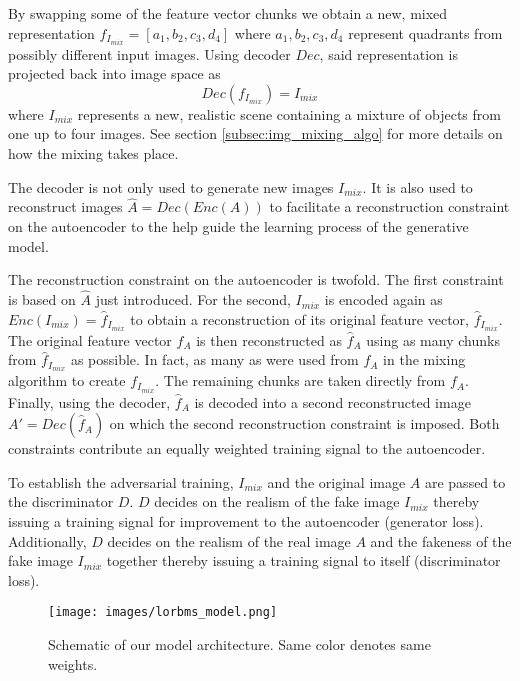 \documentclass[12pt,a4paper]{article}
\begin{document}
By swapping some of the feature vector chunks we obtain a new, mixed representation $f_{I_{mix}} = [a_1, b_2, c_3, d_4]$ where $a_1,b_2,c_3,d_4$ represent quadrants from possibly different input images. Using decoder $Dec$, said representation is projected back into image space as
\begin{equation} \label{eq:3}
    Dec(f_{I_{mix}}) = I_{mix}
\end{equation}
where $I_{mix}$ represents a new, realistic scene containing a mixture of objects from one up to four images. See section \ref{subsec:img_mixing_algo} for more details on how the mixing takes place.

The decoder is not only used to generate new images $I_{mix}$. It is also used to reconstruct images $\hat{A} = Dec(Enc(A))$ to facilitate a reconstruction constraint on the autoencoder to the help guide the learning process of the generative model.

The reconstruction constraint on the autoencoder is twofold. The first constraint is based on $\hat{A}$ just introduced. For the second, $I_{mix}$ is encoded again as $Enc(I_{mix}) = \hat{f}_{I_{mix}}$ to obtain a reconstruction of its original feature vector, $\hat{f}_{I_{mix}}$. The original feature vector $f_A$ is then reconstructed as $\hat{f}_A$ using as many chunks from $\hat{f}_{I_{mix}}$ as possible. In fact, as many as were used from $f_A$ in the mixing algorithm to create $f_{I_{mix}}$. The remaining chunks are taken directly from $f_A$. Finally, using the decoder, $\hat{f}_A$ is decoded into a second reconstructed image $A' = Dec(\hat{f}_A)$ on which the second reconstruction constraint is imposed. Both constraints contribute an equally weighted training signal to the autoencoder.

To establish the adversarial training, $I_{mix}$ and the original image $A$ are passed to the discriminator $D$. $D$ decides on the realism of the fake image $I_{mix}$ thereby issuing a training signal for improvement to the autoencoder (generator loss). Additionally, $D$ decides on the realism of the real image $A$ and the fakeness of the fake image $I_{mix}$ together thereby issuing a training signal to itself (discriminator loss).

\begin{figure}[ht]
\centering
\texttt{[image: images/lorbms\_model.png]}
\caption{Schematic of our model architecture. Same color denotes same weights.}
\label{fig:model_arch}
\end{figure}
\end{document}
